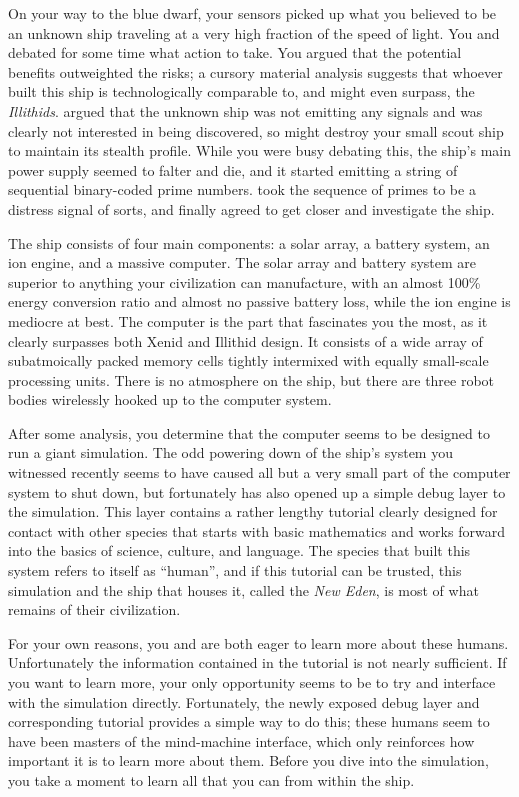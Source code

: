 \documentclass[char]{guildcamp1}
\begin{document}
On your way to the blue dwarf, your sensors picked up what you believed to be an unknown ship traveling at a very high fraction of the speed of light. You and \cPassive{\name} debated for some time what action to take. You argued that the potential benefits outweighted the risks; a cursory material analysis suggests that whoever built this ship is technologically comparable to, and might even surpass, the \emph{Illithids}. \cPassive{\name} argued that the unknown ship was not emitting any signals and was clearly not interested in being discovered, so might destroy your small scout ship to maintain its stealth profile. While you were busy debating this, the ship's main power supply seemed to falter and die, and it started emitting a string of sequential binary-coded prime numbers. \cPassive{\name} took the sequence of primes to be a distress signal of sorts, and finally agreed to get closer and investigate the ship.

The ship consists of four main components: a solar array, a battery system, an ion engine, and a massive computer. The solar array and battery system are superior to anything your civilization can manufacture, with an almost 100\% energy conversion ratio and almost no passive battery loss, while the ion engine is mediocre at best. The computer is the part that fascinates you the most, as it clearly surpasses both Xenid and Illithid design. It consists of a wide array of subatmoically packed memory cells tightly intermixed with equally small-scale processing units. There is no atmosphere on the ship, but there are three robot bodies wirelessly hooked up to the computer system.

After some analysis, you determine that the computer seems to be designed to run a giant simulation. The odd powering down of the ship's system you witnessed recently seems to have caused all but a very small part of the computer system to shut down, but fortunately has also opened up a simple debug layer to the simulation. This layer contains a rather lengthy tutorial clearly designed for contact with other species that starts with basic mathematics and works forward into the basics of science, culture, and language. The species that built this system refers to itself as ``human'', and if this tutorial can be trusted, this simulation and the ship that houses it, called the \emph{New Eden}, is most of what remains of their civilization.

For your own reasons, you and \cPassive{\name} are both eager to learn more about these humans. Unfortunately the information contained in the tutorial is not nearly sufficient. If you want to learn more, your only opportunity seems to be to try and interface with the simulation directly. Fortunately, the newly exposed debug layer and corresponding tutorial provides a simple way to do this; these humans seem to have been masters of the mind-machine interface, which only reinforces how important it is to learn more about them. Before you dive into the simulation, you take a moment to learn all that you can from within the ship.
\end{document}
